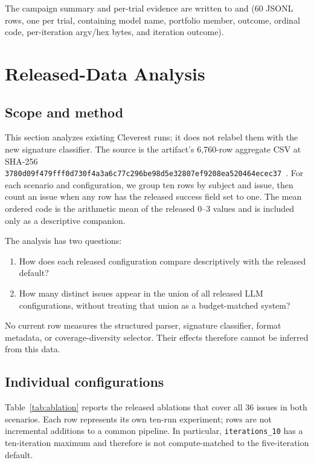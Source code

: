 \documentclass{article}
\begin{document}
The campaign summary and per-trial evidence are written to
 and
(60 JSONL rows, one per trial, containing model name, portfolio member,
outcome, ordinal code, per-iteration argv/hex bytes, and iteration
outcome).

\section{Released-Data Analysis}
\label{sec:evaluation}


\subsection{Scope and method}

This section analyzes existing Cleverest runs; it does not relabel them with the
new signature classifier.  The source is the artifact's 6,760-row aggregate
CSV at SHA-256
\nolinkurl{3780d09f479fff0d730f4a3a6c77c296be98d5e32807ef9208ea520464ecec37}~\cite{cleverest_artifact,cleverest_zenodo}.  For each scenario and
configuration, we group ten rows by subject and issue, then count an issue when
any row has the released success field set to one.  The mean ordered code is
the arithmetic mean of the released 0--3 values and is included only as a
descriptive companion.

The analysis has two questions:
\begin{enumerate}[nosep]
  \item How does each released configuration compare descriptively with the
  released default?
  \item How many distinct issues appear in the union of all released LLM
  configurations, without treating that union as a budget-matched system?
\end{enumerate}
No current row measures the structured parser, signature classifier, format
metadata, or coverage-diversity selector.  Their effects therefore cannot be
inferred from this data.

\subsection{Individual configurations}

Table~\ref{tab:ablation} reports the released ablations that cover all 36
issues in both scenarios.  Each row represents its own ten-run experiment; rows
are not incremental additions to a common pipeline.  In particular,
\texttt{iterations\_10} has a ten-iteration maximum and therefore is not
compute-matched to the five-iteration default.
\end{document}
